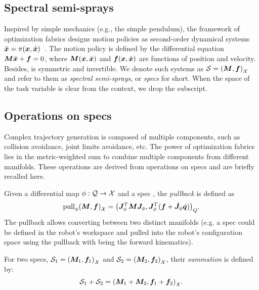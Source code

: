 \subsection{Spectral semi-sprays}%
\label{sub:semi_spectral_sprays}
%
Inspired by simple mechanics (e.g., the simple pendulum), the framework of optimization
fabrics designs motion policies as second-order dynamical
systems $\ddot{\bm{x}} = \pi(\bm{x},\dot{\bm{x}})$~\cite{Cheng2020,Ratliff2020}.
The motion policy is defined by the differential equation
$\bm{M}\ddot{\bm{x}} + \bm{f} = 0$, where $\bm{M}(\bm{x},\dot{\bm{x}})$ and $\bm{f}(\bm{x},\dot{\bm{x}})$ are functions of position and
velocity. Besides, \M{} is symmetric and invertible. We denote such systems as $\mathcal{S} = \left(\bm{M},\bm{f}\right)_{\mathcal{X}}$ and
refer to them as \textit{spectral semi-sprays}, or \textit{specs} for short.  When the space of
the task variable is clear from the context, we drop the subscript. 

\subsection{Operations on specs}%
\label{sub:operations_on_specs}
%
%
Complex trajectory generation is composed of multiple components, such as collision avoidance, joint limits
avoidance, etc. The power of optimization fabrics lies in the metric-weighted sum to
combine multiple components from different manifolds.
These operations are derived from operations on specs and are briefly recalled here.

Given a differential map $\phi: \mathcal{Q}\rightarrow\mathcal{X}$ and a spec \spec{}, the \textit{pullback}
is defined as 
\begin{equation}
  \textrm{pull}_{\phi}{\left(\bm{M},\bm{f}\right)_{\mathcal{X}}} = {\left(\bm{J}^T_{\phi}\bm{M}\bm{J}_{\phi}, \bm{J}^T_{\phi}(\bm{f}+\dot{\bm{J}}_{\phi}\dot{\bm{q}})\right)}_{Q}.
\end{equation}
The pullback allows converting between two distinct manifolds (e.g. a spec could be 
defined in the robot's workspace and pulled into the robot's configuration space using
the pullback with \map{} being the forward kinematics).

For two specs, $\mathcal{S}_1 = {\left(\bm{M}_1,\bm{f}_1\right)}_{\mathcal{X}}$ and 
$\mathcal{S}_2 = {\left(\bm{M}_2,\bm{f}_2\right)}_{\mathcal{X}}$, their \textit{summation} is defined by:
\begin{equation}
  \mathcal{S}_1 + \mathcal{S}_2 = {\left(\bm{M}_1 + \bm{M}_2, \bm{f}_1 + \bm{f}_2\right)}_{\mathcal{X}}.
  \label{eq:specs_summation}
\end{equation}
%

